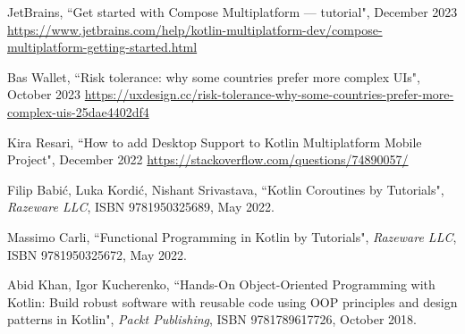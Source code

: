 
\begin{thebibliography}{100}

 JetBrains, ``Get started with Compose Multiplatform — tutorial", December 2023
\href{https://www.jetbrains.com/help/kotlin-multiplatform-dev/compose-multiplatform-getting-started.html}{https://www.jetbrains.com/help/kotlin-multiplatform-dev/compose-multiplatform-getting-started.html}

 Bas Wallet, ``Risk tolerance: why some countries prefer more complex UIs", October 2023
\href{https://uxdesign.cc/risk-tolerance-why-some-countries-prefer-more-complex-uis-25dae4402df4}{https://uxdesign.cc/risk-tolerance-why-some-countries-prefer-more-complex-uis-25dae4402df4} 

 Kira Resari, ``How to add Desktop Support to Kotlin Multiplatform Mobile Project", December 2022
\href{https://stackoverflow.com/questions/74890057/}{https://stackoverflow.com/questions/74890057/}

 Filip Babić, Luka Kordić, Nishant Srivastava, ``Kotlin Coroutines by Tutorials", 
\emph{Razeware LLC}, ISBN 9781950325689, May 2022.

 Massimo Carli, ``Functional Programming in Kotlin by Tutorials", \emph{Razeware LLC}, 
ISBN 9781950325672, May 2022.

 Abid Khan, Igor Kucherenko, ``Hands-On Object-Oriented Programming with Kotlin: Build robust 
software with reusable code using OOP principles and design patterns in Kotlin", \emph{Packt Publishing}, 
ISBN 9781789617726, October 2018.

\end{thebibliography}
